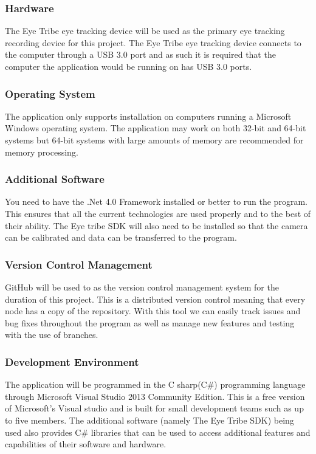 \subsubsection{Hardware}
The Eye Tribe eye tracking device will be used as the primary eye tracking recording device for this project. The Eye Tribe eye tracking device connects to the computer through a USB 3.0 port and as such it is required that the computer the application would be running on has USB 3.0 ports.

\subsubsection{Operating System}
The application only supports installation on computers running a Microsoft Windows operating system. The application may work on both 32-bit and 64-bit systems but 64-bit systems with large amounts of memory are recommended for memory processing. 

\subsubsection{Additional Software}
You need to have the .Net 4.0 Framework installed or better to run the program. This ensures that all the current technologies are used properly and to the best of their ability. The Eye tribe SDK will also need to be installed so that the camera can be calibrated and data can be transferred to the program.

\subsubsection{Version Control Management}
GitHub will be used to as the version control management system for the duration of this project.
This is a distributed version control meaning that every node has a copy of the repository. With this tool we can easily track issues and bug fixes throughout the program as well as manage new features and testing with the use of branches.

\subsubsection{Development Environment}
The application will be programmed in the C sharp(C\#) programming language through Microsoft Visual Studio 2013 Community Edition. This is a free version of Microsoft's Visual studio and is built for small development teams such as up to five members. The additional software (namely The Eye Tribe SDK) being used also provides C\# libraries that can be used to access additional features and capabilities of their software and hardware.
